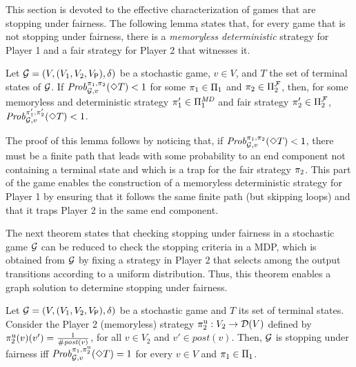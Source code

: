 This section is devoted to the effective
characterization of games that are stopping under fairness.
The
following lemma states that, for every game that is not stopping under
fairness, there is a \emph{memoryless deterministic} strategy for
Player 1 and a fair strategy for Player 2 that witnesses it.


\begin{lemma}\label{lemma:memoryless-strat}
  Let $\mathcal{G} = (V, (V_1, V_2, V_{\mathsf{P}}), \delta)$ be a
  stochastic game, $v \in V$, and $T$ the set of terminal states of $\mathcal{G}$.
  If $\mathit{Prob}^{\pi_{1}, \pi_{2}}_{\mathcal{G}, v}(\Diamond T) < 1$
  for some
  $\pi_{1} \in \Pi_{1}$ and $\pi_{2} \in \Pi^{\mathcal{F}}_{2}$,
  then, for some memoryless and deterministic strategy
  $\pi_{1}' \in \Pi^{\textit{MD}}_{1}$ and fair strategy
  $\pi_{2}' \in \Pi^{\mathcal{F}}_{2}$,
  $\mathit{Prob}^{\pi_{1}', \pi_{2}'}_{\mathcal{G}, v}(\Diamond T) < 1$.
\end{lemma}


The proof of this lemma follows by noticing that, if
$\mathit{Prob}^{\pi_{1}, \pi_{2}}_{\mathcal{G}, v}(\Diamond T) < 1$, there
must be a finite path that leads with some probability to an end
component not containing a terminal state and which is a trap for the
fair strategy $\pi_{2}$.  This part of the game enables the
construction of a memoryless deterministic strategy for Player 1 by
ensuring that it follows the same finite path (but skipping loops) and
that it traps Player 2 in the same end component.

	
The next theorem states that checking stopping under fairness in a
stochastic game $\mathcal{G}$ can be reduced to check the stopping
criteria in a MDP, which is obtained from $\mathcal{G}$ by fixing a strategy in
Player 2 that selects among the output transitions according to a
uniform distribution.  Thus, this theorem enables a graph solution to
determine stopping under fairness.


\begin{theorem}\label{thm:uniform-prob}
  Let $\mathcal{G} = (V, (V_1, V_2, V_{\mathsf{P}}), \delta)$ be a
  stochastic game and $T$ its set of terminal states.
  Consider the Player 2 (memoryless) strategy
  $\pi^{\mathrm{u}}_{2} : V_2 \rightarrow \mathcal{D}(V)$ defined by
  $\pi^{\mathrm{u}}_{2}(v)(v') = \frac{1}{\# \mathit{post}(v)}$, for all $v \in
  V_2$ and $v' \in post(v)$.
  Then, $\mathcal{G}$ is stopping under fairness iff
  $\mathit{Prob}^{\pi_{1}, \pi^{\mathrm{u}}_{2}}_{\mathcal{G},v}(\Diamond T)=1$ for
  every $v\in V$ and $\pi_{1} \in \Pi_{1}$.
\end{theorem}


